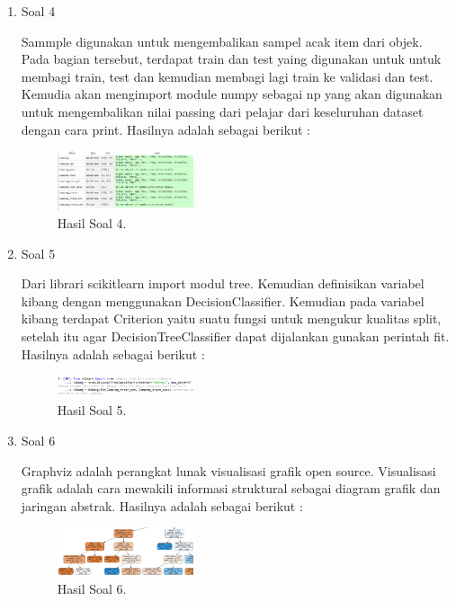 \begin{enumerate}
	\item Soal 4
	\hfill\break
	
	Sammple digunakan untuk mengembalikan sampel acak item dari objek. Pada bagian tersebut, terdapat train dan test yaing digunakan untuk untuk membagi train, test dan kemudian membagi lagi train ke validasi dan test. Kemudia akan mengimport module numpy sebagai np yang akan digunakan untuk mengembalikan nilai passing dari pelajar dari keseluruhan dataset dengan cara print. Hasilnya adalah sebagai berikut :
	\begin{figure}[H]
	\centering
		\includegraphics[width=4cm]{figures/1174017/2/hasilsoal4.PNG}
		\caption{Hasil Soal 4.}
	\end{figure}

	\item Soal 5
	\hfill\break
	
	Dari librari scikitlearn import modul tree. Kemudian definisikan variabel kibang dengan menggunakan DecisionClassifier. Kemudian pada variabel kibang terdapat Criterion yaitu suatu fungsi untuk mengukur kualitas split, setelah itu agar DecisionTreeClassifier dapat dijalankan gunakan perintah fit. Hasilnya adalah sebagai berikut :
	\begin{figure}[H]
	\centering
		\includegraphics[width=4cm]{figures/1174017/2/hasilsoal5.PNG}
		\caption{Hasil Soal 5.}
	\end{figure}

	\item Soal 6
	\hfill\break
	
	Graphviz adalah perangkat lunak visualisasi grafik open source. Visualisasi grafik adalah cara mewakili informasi struktural sebagai diagram grafik dan jaringan abstrak. Hasilnya adalah sebagai berikut :
	\begin{figure}[H]
	\centering
		\includegraphics[width=4cm]{figures/1174017/2/hasilsoal6.PNG}
		\caption{Hasil Soal 6.}
	\end{figure}


\end{enumerate}
